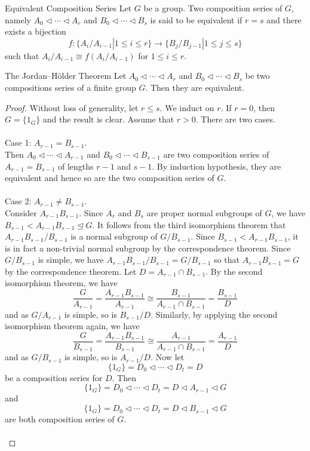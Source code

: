 \documentclass[a4paper]{article}
\begin{document}
\begin{defn}{Equivalent Composition Series}{} Let $G$ be a group. Two composition series of $G$, namely $A_0\triangleleft\cdots\triangleleft A_r$ and $B_0\triangleleft\cdots\triangleleft B_s$ is said to be equivalent if $r=s$ and there exists a bijection $$f:\{A_i/A_{i-1}|1\leq i\leq r\}\to\{B_j/B_{j-1}|1\leq j\leq s\}$$ such that $A_i/A_{i-1}\cong f(A_i/A_{i-1})$ for $1\leq i\leq r$. 
\end{defn}

\begin{thm}{The Jordan–Hölder Theorem}{} Let $A_0\triangleleft\cdots\triangleleft A_r$ and $B_0\triangleleft\cdots\triangleleft B_s$ be two compositions series of a finite group $G$. Then they are equivalent. \tcbline
\begin{proof}
Without loss of generality, let $r\leq s$. We induct on $r$. If $r=0$, then $G=\{1_G\}$ and the result is clear. Assume that $r>0$. There are two cases. \\~\\

Case 1: $A_{r-1}=B_{s-1}$. \\
Then $A_0\triangleleft\cdots\triangleleft A_{r-1}$ and $B_0\triangleleft\cdots\triangleleft B_{s-1}$ are two composition series of $A_{r-1}=B_{s-1}$ of lengths $r-1$ and $s-1$. By induction hypothesis, they are equivalent and hence so are the two composition series of $G$. \\~\\

Case 2: $A_{r-1}\neq B_{s-1}$. \\
Consider $A_{r-1}B_{s-1}$. Since $A_r$ and $B_s$ are proper normal subgroups of $G$, we have $B_{s-1}<A_{r-1}B_{s-1}\trianglelefteq G$. It follows from the third isomorphism theorem that $A_{r-1}B_{s-1}/B_{s-1}$ is a normal subgroup of $G/B_{s-1}$. Since $B_{s-1}<A_{r-1}B_{s-1}$, it is in fact a non-trivial normal subgroup by the correspondence theorem. Since $G/B_{s-1}$ is simple, we have $A_{r-1}B_{s-1}/B_{s-1}=G/B_{s-1}$ so that $A_{r-1}B_{s-1}=G$ by the correspondence theorem. Let $D=A_{r-1}\cap B_{s-1}$. By the second isomorphism theorem, we have $$\frac{G}{A_{r-1}}=\frac{A_{r-1}B_{s-1}}{A_{r-1}}\cong\frac{B_{s-1}}{A_{r-1}\cap B_{s-1}}=\frac{B_{s-1}}{D}$$ and as $G/A_{r-1}$ is simple, so is $B_{s-1}/D$. Similarly, by applying the second isomorphism theorem again, we have $$\frac{G}{B_{s-1}}=\frac{A_{r-1}B_{s-1}}{B_{s-1}}\cong\frac{A_{r-1}}{A_{r-1}\cap B_{s-1}}=\frac{A_{r-1}}{D}$$ and as $G/B_{s-1}$ is simple, so is $A_{r-1}/D$. Now let $$\{1_G\}=D_0\triangleleft\cdots\triangleleft D_t=D$$ be a composition series for $D$. Then $$\{1_G\}=D_0\triangleleft\cdots\triangleleft D_t=D\triangleleft A_{r-1}\triangleleft G$$ and $$\{1_G\}=D_0\triangleleft\cdots\triangleleft D_t=D\triangleleft B_{s-1}\triangleleft G$$ are both composition series of $G$. \\~\\


\end{proof}
\end{thm}
\end{document}
